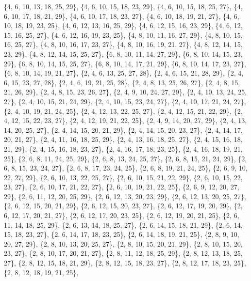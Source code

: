 \documentclass[11pt,a4paper]{article}
\begin{document}
{\{4, 6, 10, 13, 18, 25, 29\}, \{4, 6, 10, 15, 18, 23, 29\}, \{4, 6, 10, 15, 18, 25, 27\}, \{4, 6, 10, 17, 18, 21, 29\}, \{4, 6, 10, 17, 18, 23, 27\},
\{4, 6, 10, 18, 19, 21, 27\}, \{4, 6, 10, 18, 19, 23, 25\}, \{4, 6, 12, 13, 16, 25, 29\}, \{4, 6, 12, 15, 16, 23, 29\}, \{4, 6, 12, 15, 16, 25, 27\},
\{4, 6, 12, 16, 19, 23, 25\}, \{4, 8, 10, 11, 16, 27, 29\}, \{4, 8, 10, 15, 16, 25, 27\}, \{4, 8, 10, 16, 17, 23, 27\}, \{4, 8, 10, 16, 19, 21, 27\},
\{4, 8, 12, 14, 15, 23, 29\}, \{4, 8, 12, 14, 15, 25, 27\}, \{6, 8, 10, 11, 14, 27, 29\}, \{6, 8, 10, 14, 15, 23, 29\}, \{6, 8, 10, 14, 15, 25, 27\},
\{6, 8, 10, 14, 17, 21, 29\}, \{6, 8, 10, 14, 17, 23, 27\}, \{6, 8, 10, 14, 19, 21, 27\}, \{2, 4, 6, 13, 25, 27, 28\}, \{2, 4, 6, 15, 21, 28, 29\},
\{2, 4, 6, 15, 23, 27, 28\}, \{2, 4, 6, 19, 21, 25, 28\}, \{2, 4, 8, 13, 25, 26, 27\}, \{2, 4, 8, 15, 21, 26, 29\}, \{2, 4, 8, 15, 23, 26, 27\},
\{2, 4, 9, 10, 24, 27, 29\}, \{2, 4, 10, 13, 24, 25, 27\}, \{2, 4, 10, 15, 21, 24, 29\}, \{2, 4, 10, 15, 23, 24, 27\}, \{2, 4, 10, 17, 21, 24, 27\},
\{2, 4, 10, 19, 21, 24, 25\}, \{2, 4, 12, 13, 22, 25, 27\}, \{2, 4, 12, 15, 21, 22, 29\}, \{2, 4, 12, 15, 22, 23, 27\}, \{2, 4, 12, 19, 21, 22, 25\},
\{2, 4, 9, 14, 20, 27, 29\}, \{2, 4, 13, 14, 20, 25, 27\}, \{2, 4, 14, 15, 20, 21, 29\}, \{2, 4, 14, 15, 20, 23, 27\}, \{2, 4, 14, 17, 20, 21, 27\},
\{2, 4, 11, 16, 18, 25, 29\}, \{2, 4, 13, 16, 18, 25, 27\}, \{2, 4, 15, 16, 18, 21, 29\}, \{2, 4, 15, 16, 18, 23, 27\}, \{2, 4, 16, 17, 18, 23, 25\},
\{2, 4, 16, 18, 19, 21, 25\}, \{2, 6, 8, 11, 24, 25, 29\}, \{2, 6, 8, 13, 24, 25, 27\}, \{2, 6, 8, 15, 21, 24, 29\}, \{2, 6, 8, 15, 23, 24, 27\},
\{2, 6, 8, 17, 23, 24, 25\}, \{2, 6, 8, 19, 21, 24, 25\}, \{2, 6, 9, 10, 22, 27, 29\}, \{2, 6, 10, 13, 22, 25, 27\}, \{2, 6, 10, 15, 21, 22, 29\},
\{2, 6, 10, 15, 22, 23, 27\}, \{2, 6, 10, 17, 21, 22, 27\}, \{2, 6, 10, 19, 21, 22, 25\}, \{2, 6, 9, 12, 20, 27, 29\}, \{2, 6, 11, 12, 20, 25, 29\},
\{2, 6, 12, 13, 20, 23, 29\}, \{2, 6, 12, 13, 20, 25, 27\}, \{2, 6, 12, 15, 20, 21, 29\}, \{2, 6, 12, 15, 20, 23, 27\}, \{2, 6, 12, 17, 19, 20, 29\},
\{2, 6, 12, 17, 20, 21, 27\}, \{2, 6, 12, 17, 20, 23, 25\}, \{2, 6, 12, 19, 20, 21, 25\}, \{2, 6, 11, 14, 18, 25, 29\}, \{2, 6, 13, 14, 18, 25, 27\},
\{2, 6, 14, 15, 18, 21, 29\}, \{2, 6, 14, 15, 18, 23, 27\}, \{2, 6, 14, 17, 18, 23, 25\}, \{2, 6, 14, 18, 19, 21, 25\}, \{2, 8, 9, 10, 20, 27, 29\},
\{2, 8, 10, 13, 20, 25, 27\}, \{2, 8, 10, 15, 20, 21, 29\}, \{2, 8, 10, 15, 20, 23, 27\}, \{2, 8, 10, 17, 20, 21, 27\}, \{2, 8, 11, 12, 18, 25, 29\},
\{2, 8, 12, 13, 18, 25, 27\}, \{2, 8, 12, 15, 18, 21, 29\}, \{2, 8, 12, 15, 18, 23, 27\}, \{2, 8, 12, 17, 18, 23, 25\}, \{2, 8, 12, 18, 19, 21, 25\},
}
\end{document}
